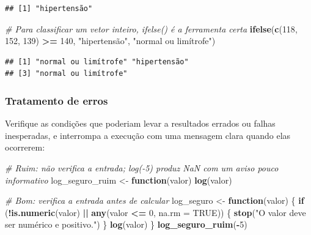 \documentclass[
]{book}
\newenvironment{Shaded}{\begin{snugshade}}{\end{snugshade}}
\newcommand{\AttributeTok}[1]{\textcolor[rgb]{0.13,0.29,0.53}{#1}}
\newcommand{\CommentTok}[1]{\textcolor[rgb]{0.56,0.35,0.01}{\textit{#1}}}
\newcommand{\ConstantTok}[1]{\textcolor[rgb]{0.56,0.35,0.01}{#1}}
\newcommand{\ControlFlowTok}[1]{\textcolor[rgb]{0.13,0.29,0.53}{\textbf{#1}}}
\newcommand{\DecValTok}[1]{\textcolor[rgb]{0.00,0.00,0.81}{#1}}
\newcommand{\FunctionTok}[1]{\textcolor[rgb]{0.13,0.29,0.53}{\textbf{#1}}}
\newcommand{\NormalTok}[1]{#1}
\newcommand{\OtherTok}[1]{\textcolor[rgb]{0.56,0.35,0.01}{#1}}
\newcommand{\SpecialCharTok}[1]{\textcolor[rgb]{0.81,0.36,0.00}{\textbf{#1}}}
\newcommand{\StringTok}[1]{\textcolor[rgb]{0.31,0.60,0.02}{#1}}
\begin{document}
\begin{verbatim}
## [1] "hipertensão"
\end{verbatim}

\begin{Shaded}
\begin{Highlighting}[]
\CommentTok{\# Para classificar um vetor inteiro, ifelse() é a ferramenta certa}
\FunctionTok{ifelse}\NormalTok{(}\FunctionTok{c}\NormalTok{(}\DecValTok{118}\NormalTok{, }\DecValTok{152}\NormalTok{, }\DecValTok{139}\NormalTok{) }\SpecialCharTok{\textgreater{}=} \DecValTok{140}\NormalTok{, }\StringTok{"hipertensão"}\NormalTok{, }\StringTok{"normal ou limítrofe"}\NormalTok{)}
\end{Highlighting}
\end{Shaded}

\begin{verbatim}
## [1] "normal ou limítrofe" "hipertensão"        
## [3] "normal ou limítrofe"
\end{verbatim}

\subsubsection{Tratamento de erros}\label{tratamento-de-erros}

Verifique as condições que poderiam levar a resultados errados ou falhas inesperadas, e interrompa a execução com uma mensagem clara quando elas ocorrerem:

\begin{Shaded}
\begin{Highlighting}[]
\CommentTok{\# Ruim: não verifica a entrada; log({-}5) produz NaN com um aviso pouco informativo}
\NormalTok{log\_seguro\_ruim }\OtherTok{\textless{}{-}} \ControlFlowTok{function}\NormalTok{(valor) }\FunctionTok{log}\NormalTok{(valor)}

\CommentTok{\# Bom: verifica a entrada antes de calcular}
\NormalTok{log\_seguro }\OtherTok{\textless{}{-}} \ControlFlowTok{function}\NormalTok{(valor) \{}
  \ControlFlowTok{if}\NormalTok{ (}\SpecialCharTok{!}\FunctionTok{is.numeric}\NormalTok{(valor) }\SpecialCharTok{||} \FunctionTok{any}\NormalTok{(valor }\SpecialCharTok{\textless{}=} \DecValTok{0}\NormalTok{, }\AttributeTok{na.rm =} \ConstantTok{TRUE}\NormalTok{)) \{}
    \FunctionTok{stop}\NormalTok{(}\StringTok{"O valor deve ser numérico e positivo."}\NormalTok{)}
\NormalTok{  \}}
  \FunctionTok{log}\NormalTok{(valor)}
\NormalTok{\}}
\FunctionTok{log\_seguro\_ruim}\NormalTok{(}\SpecialCharTok{{-}}\DecValTok{5}\NormalTok{)}
\end{Highlighting}
\end{Shaded}
\end{document}
